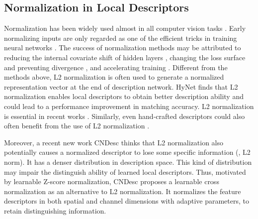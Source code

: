 \documentclass[journal]{IEEEtran}
\begin{document}
\subsection{Normalization in Local Descriptors}
Normalization has been widely used almost in all computer vision tasks \cite{BN,GN}. Early normalizing inputs are only regarded as one of the efficient tricks in training neural networks \cite{645754.668382}. The success of normalization methods may be attributed to reducing the internal covariate shift of hidden layers \cite{BN,LayerN}, changing the loss surface and preventing divergence \cite{3305381.3305417}, and accelerating training \cite{BN}. Different from the methods above, L2 normalization is often used to generate a normalized representation vector at the end of description network. HyNet \cite{HyNet} finds that L2 normalization enables local descriptors to obtain better description ability and could lead to a performance improvement in matching accuracy. L2 normalization is essential in recent works \cite{SuperPoint,disk}. Similarly, even hand-crafted descriptors could also often benefit from the use of L2 normalization \cite{HPatches}. 

Moreover, a recent new work CNDesc \cite{cndesc} thinks that L2 normalization also potentially causes a normalized descriptor to lose some specific information (, L2 norm). It has a denser distribution in description space. This kind of distribution may impair the distinguish ability of learned local descriptors. Thus, motivated by learnable Z-score normalization, CNDesc proposes a learnable cross normalization as an alternative to L2 normalization.
It normalizes the feature descriptors in both spatial and channel dimensions with adaptive parameters, to retain distinguishing information. 
\end{document}
